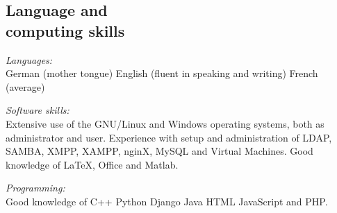 \documentclass[margin,line]{resume}
\def\tb{\textbullet\;}
\begin{document}
\begin{resume}
\section{\mysidestyle Language and\\ computing skills}

{\it Languages:}\\
  \tb German (mother tongue)
  \tb English (fluent in speaking and writing)
  \tb French (average)



{\it Software skills:}\\
  Extensive use of the \tb GNU/Linux and \tb Windows operating systems, both as administrator and user.
  Experience with setup and administration of \tb LDAP, \tb SAMBA, \tb XMPP, \tb XAMPP, \tb nginX, \tb MySQL and \tb Virtual Machines.
  Good knowledge of \tb \LaTeX, \tb Office and \tb Matlab.

{\it Programming:}\\
  Good knowledge of \tb C++ \tb Python \tb Django \tb Java \tb HTML \tb JavaScript and \tb PHP.


\end{resume}
\end{document}
